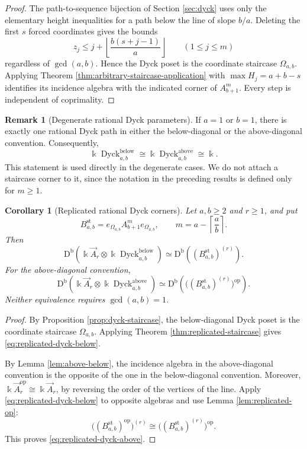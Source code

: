\documentclass[12pt,a4paper,english,reqno]{amsart}
\theoremstyle{plain}
\newtheorem{corollary}[theorem]{Corollary}
\theoremstyle{definition}
\newtheorem{remark}[theorem]{Remark}
\newcommand{\kk}{\Bbbk}
\newcommand{\Db}{\mathrm D^{\mathrm b}}
\newcommand{\Dyck}{\operatorname{Dyck}}
\newcommand{\op}{\mathrm{op}}
\begin{document}
\begin{proof}
The path-to-sequence bijection of Section \ref{sec:dyck} uses only the elementary
height inequalities for a path below the line of slope $b/a$.  Deleting
the first $s$ forced coordinates gives the bounds
\[
 z_j\leq
 j+\left\lfloor\frac{b(s+j-1)}a\right\rfloor
 \qquad(1\leq j\leq m)
\]
regardless of $\gcd(a,b)$.  Hence the Dyck poset is the coordinate
staircase $\Omega_{a,b}$.  Applying
Theorem \ref{thm:arbitrary-staircase-application} with
$\max H_j=a+b-s$ identifies its incidence algebra with the indicated
corner of $A_{b+1}^{m}$.  Every step is independent of coprimality.
\end{proof}

\begin{remark}[Degenerate rational Dyck parameters]
\label{rem:degenerate-dyck}
If $a=1$ or $b=1$, there is exactly one rational Dyck path in either
the below-diagonal or the above-diagonal convention.  Consequently,
\[
 \kk\Dyck^{\mathrm{below}}_{a,b}
 \cong
 \kk\Dyck^{\mathrm{above}}_{a,b}
 \cong\kk.
\]
This statement is used directly in the degenerate cases.  We do not attach a
staircase corner to it, since the notation in the preceding results is
defined only for $m\geq1$.
\end{remark}

\begin{corollary}[Replicated rational Dyck corners]
\label{cor:replicated-rational-dyck}
Let $a,b\geq2$ and $r\geq1$, and put
\[
 B^{\mathrm{st}}_{a,b}
 =
 e_{\Omega_{a,b}}A_{b+1}^{m}e_{\Omega_{a,b}},
 \qquad
 m=a-\left\lceil\frac ab\right\rceil.
\]
Then
\begin{equation}
 \Db\!\left(
 \kk\vec A_r\otimes
 \kk\Dyck^{\mathrm{below}}_{a,b}
 \right)
 \simeq
 \Db\!\left(
 (B^{\mathrm{st}}_{a,b})^{(r)}
 \right).
\label{eq:replicated-dyck-below}
\end{equation}
For the above-diagonal convention,
\begin{equation}
 \Db\!\left(
 \kk\vec A_r\otimes
 \kk\Dyck^{\mathrm{above}}_{a,b}
 \right)
 \simeq
 \Db\!\left(
 \bigl((B^{\mathrm{st}}_{a,b})^{(r)}\bigr)^{\op}
 \right).
\label{eq:replicated-dyck-above}
\end{equation}
Neither equivalence requires $\gcd(a,b)=1$.
\end{corollary}

\begin{proof}
By Proposition \ref{prop:dyck-staircase}, the below-diagonal Dyck poset is the
coordinate staircase $\Omega_{a,b}$.  Applying
Theorem \ref{thm:replicated-staircase} gives
\eqref{eq:replicated-dyck-below}.

By Lemma \ref{lem:above-below}, the incidence algebra in the
above-diagonal convention is the opposite of the one in the
below-diagonal convention.  Moreover,
$\kk\vec A_r^{\op}\cong\kk\vec A_r$, by reversing the order of
the vertices of the line.  Apply
\eqref{eq:replicated-dyck-below} to opposite algebras and use
Lemma \ref{lem:replicated-op}:
\[
 \bigl((B^{\mathrm{st}}_{a,b})^{\op}\bigr)^{(r)}
 \cong
 \bigl((B^{\mathrm{st}}_{a,b})^{(r)}\bigr)^{\op}.
\]
This proves \eqref{eq:replicated-dyck-above}.
\end{proof}
\end{document}
